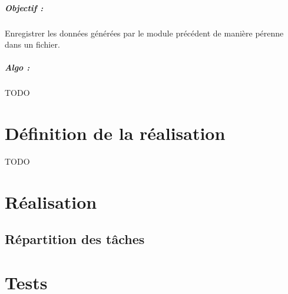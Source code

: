     \paragraph{Objectif :} Enregistrer les données générées par le module précédent de manière pérenne dans un fichier.
    \paragraph{Algo :}
	TODO

\chapter{Définition de la réalisation}
	TODO

\chapter{Réalisation}
\section{Répartition des tâches}

\chapter{Tests}

